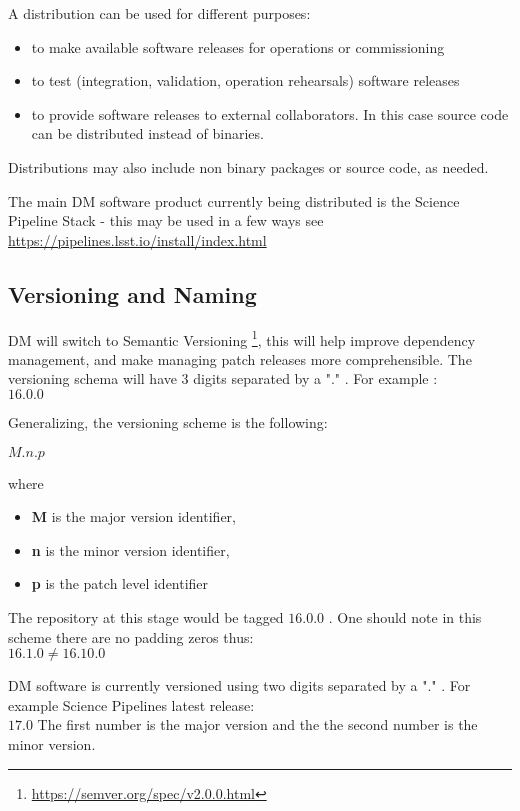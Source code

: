 A distribution can be used for different purposes:

\begin{itemize}
\item to make available software releases for operations or commissioning
\item to test (integration, validation, operation rehearsals) software releases
\item to provide software releases to external collaborators. In this case source code can be distributed instead of binaries.
\end{itemize}

Distributions may also include non binary packages or source code, as needed.

The main DM software product currently being distributed is the Science Pipeline Stack -
this may be used in a few ways see \url{https://pipelines.lsst.io/install/index.html}


\subsection{Versioning and Naming} \label{sec:versioning}
DM will  switch to Semantic Versioning \footnote{\url{https://semver.org/spec/v2.0.0.html}},  this will help improve dependency management, and make  managing patch releases more comprehensible.
The versioning schema will have 3 digits separated by a "." . For example :
\\
$16.0.0$

Generalizing, the versioning scheme is the following:

$M.n.p$

where 

\begin{itemize}
\item \textbf{M} is the major version identifier,
\item \textbf{n} is the minor version identifier,
\item \textbf{p} is the patch level identifier
\end{itemize}

The repository at this stage would be tagged $16.0.0$ .
One should note in this scheme there are no padding zeros thus:
\\
$16.1.0   \neq 16.10.0$

DM software is currently versioned using two digits separated by a "." .
For example Science Pipelines latest release:\\
$17.0$
The first number is the major version and the the second number is the minor version.


